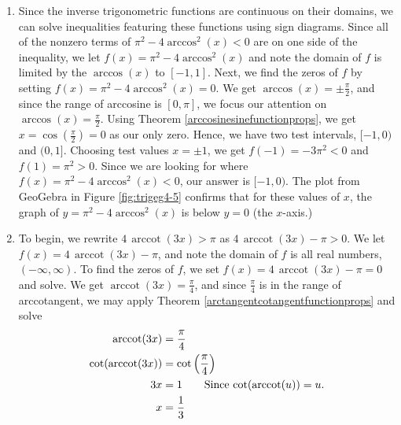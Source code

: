 {\begin{enumerate}
Plotting in GeoGebra verifies our result: see Figure \ref{fig:trigeg4-4}.


\drawexampleline

\item Since the inverse trigonometric functions are continuous on their domains, we can solve inequalities featuring these functions using sign diagrams. Since all of the nonzero terms of  $\pi^2-4\arccos^{2}(x) < 0$ are on one side of the inequality, we let $f(x) = \pi^2-4\arccos^{2}(x)$ and note the domain of $f$ is limited by the $\arccos(x)$ to $[-1,1]$.  Next, we find the zeros of $f$ by setting $f(x) = \pi^2-4\arccos^{2}(x) = 0$.  We get $\arccos(x) = \pm \frac{\pi}{2}$, and since the range of arccosine is $[0,\pi]$, we focus our attention on $\arccos(x) = \frac{\pi}{2}$.  Using Theorem \ref{arccosinesinefunctionprops}, we get $x = \cos\left(\frac{\pi}{2}\right) = 0$ as our only zero.  Hence, we have two test intervals, $[-1,0)$ and $(0,1]$.  Choosing test values $x = \pm 1$, we get $f(-1) = -3\pi^2 < 0$ and $f(1) = \pi^2 > 0$.  Since we are looking for where $f(x) = \pi^2-4\arccos^{2}(x) < 0$, our answer is $[-1,0)$.  The plot from GeoGebra in Figure \ref{fig:trigeg4-5} confirms that for these values of $x$, the graph of $y = \pi^2-4\arccos^{2}(x)$ is below $y = 0$ (the $x$-axis.)





\item   To begin, we rewrite $4 \, \operatorname{arccot}(3x) > \pi$ as $4 \, \operatorname{arccot}(3x) -  \pi > 0$.  We let $f(x) = 4 \, \operatorname{arccot}(3x) -  \pi$, and note the domain of $f$ is all real numbers, $(-\infty, \infty)$.  To find the zeros of $f$, we set $f(x) = 4 \, \operatorname{arccot}(3x) -  \pi = 0$ and solve.  We get $\operatorname{arccot}(3x) = \frac{\pi}{4}$, and since $\frac{\pi}{4}$ is in the range of arccotangent, we may apply Theorem \ref{arctangentcotangentfunctionprops} and solve 
\begin{align*}
\operatorname{arccot}(3x) & =  \frac{\pi}{4} \\
\cot(\operatorname{arccot}(3x)) & = \cot\left(\frac{\pi}{4}\right) \\
3x & =  1  \tag*{Since $\cot(\operatorname{arccot}(u)) = u$.} \\
x & = \frac{1}{3}
\end{align*}


\end{enumerate}}
